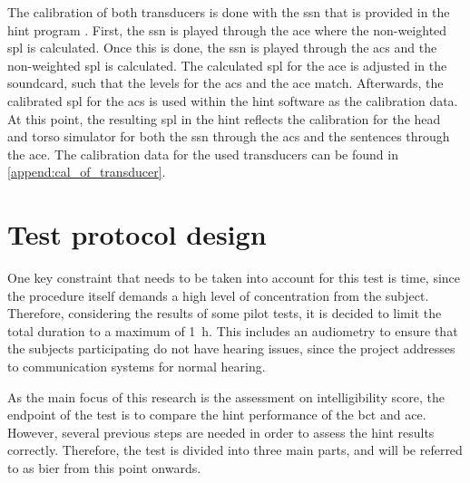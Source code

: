The calibration of both transducers is done with the \gls{ssn} that is provided in the \gls{hint} program \citep{nilsson_95}. First, the \gls{ssn} is played through the \gls{ace} where the non-weighted \gls{spl} is calculated. Once this is done, the \gls{ssn} is played through the \gls{acs} and the non-weighted \gls{spl} is calculated. The calculated \gls{spl} for the \gls{ace} is adjusted in the soundcard, such that the levels for the \gls{acs} and the \gls{ace} match. Afterwards, the calibrated \gls{spl} for the \gls{acs} is used within the \gls{hint} software as the calibration data. At this point, the resulting \gls{spl}  in the \gls{hint} reflects the calibration for the head and torso simulator for both the \gls{ssn} through the \gls{acs} and the sentences through the \gls{ace}. The calibration data for the used transducers can be found in \autoref{append:cal_of_transducer}.
   
   
   
\section{Test protocol design}
\label{sec:test_protocol_design}   
One key constraint that needs to be taken into account for this test is time, since the procedure itself demands a high level of concentration from the subject. Therefore, considering the results of some pilot tests, it is decided to limit the total duration to a maximum of \SI{1}{\hour}. This includes an audiometry to ensure that the subjects participating do not have hearing issues, since the project addresses to communication systems for normal hearing.
 
As the main focus of this research is the assessment on intelligibility score, the endpoint of the test is to compare the \gls{hint} performance of the \gls{bct} and \gls{ace}. However, several previous steps are needed in order to assess the \gls{hint} results correctly. Therefore, the test is divided into three main parts, and will be referred to as \gls{bier} from this point onwards. 
 
 
 
